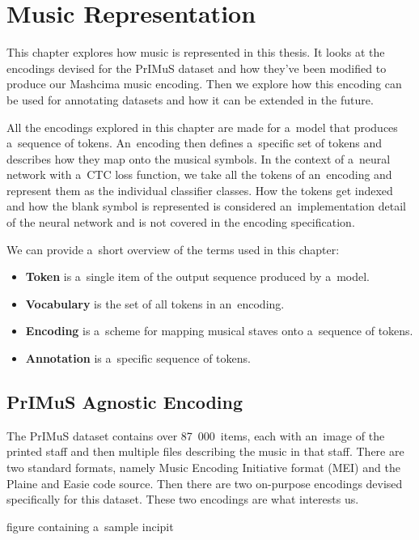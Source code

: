 \chapter{Music Representation}
\label{chap:MusicRepresentation}

This chapter explores how music is represented in this thesis. It looks at the encodings devised for the PrIMuS dataset and how they've been modified to produce our Mashcima music encoding. Then we explore how this encoding can be used for annotating datasets and how it can be extended in the future.

All the encodings explored in this chapter are made for a~model that produces a~sequence of tokens. An~encoding then defines a~specific set of tokens and describes how they map onto the musical symbols. In the context of a~neural network with a~CTC loss function, we take all the tokens of an~encoding and represent them as the individual classifier classes. How the tokens get indexed and how the blank symbol is represented is considered an~implementation detail of the neural network and is not covered in the encoding specification.

We can provide a~short overview of the terms used in this chapter:

\begin{itemize}
\item \textbf{Token} is a~single item of the output sequence produced by a~model.
\item \textbf{Vocabulary} is the set of all tokens in an~encoding.
\item \textbf{Encoding} is a~scheme for mapping musical staves onto a~sequence of tokens.
\item \textbf{Annotation} is a~specific sequence of tokens.
\end{itemize}


\section{PrIMuS Agnostic Encoding}

The PrIMuS dataset contains over 87~000~items, each with an~image of the printed staff and then multiple files describing the music in that staff. There are two standard formats, namely Music Encoding Initiative format (MEI) and the Plaine and Easie code source. Then there are two on-purpose encodings devised specifically for this dataset. These two encodings are what interests us.

\begin{code}
figure containing a~sample incipit
\end{code}

